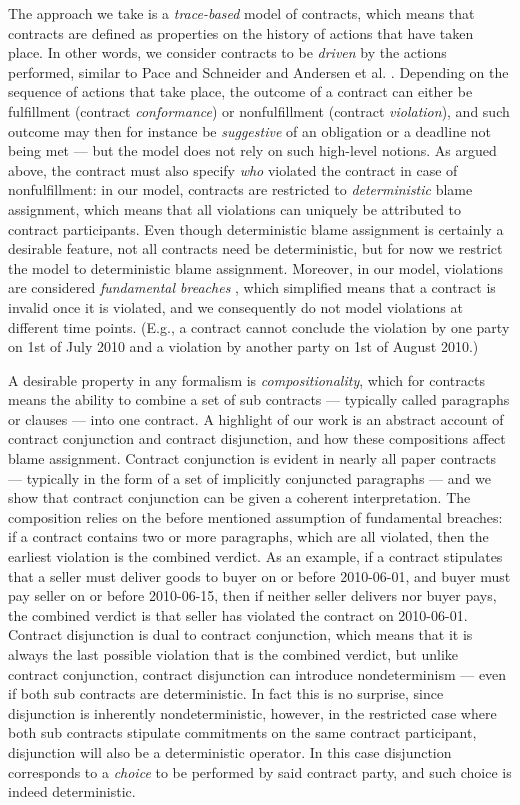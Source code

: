 \documentclass[orivec,final]{llncs-href}
\begin{document}
The approach we take is a \emph{trace-based} model of contracts, which
means that contracts are defined as properties on the history of
actions that have taken place. In other words, we consider contracts 
to be \emph{driven} by the actions performed, similar to Pace and
Schneider \cite{pace09challenges} and Andersen et
al. \cite{andersen06contracts}. Depending on the sequence of actions
that take place, the outcome of a contract can either be fulfillment
(contract \emph{conformance}) or nonfulfillment (contract
\emph{violation}), and such outcome may then for instance be
\emph{suggestive} of an obligation or a deadline not being met --- but the model
does not rely on such high-level notions. As argued above, the
contract must also specify \emph{who} violated the contract in case of
nonfulfillment: in our model, contracts are restricted to
\emph{deterministic} blame assignment, which means that all violations
can uniquely be attributed to contract participants. Even though
deterministic blame assignment is certainly a desirable feature, not
all contracts need be deterministic, but for now we restrict the model
to deterministic blame assignment.
Moreover, in our model, violations are considered 
\emph{fundamental breaches} \cite{wikipedia10fundamentalbreach}, which 
simplified means that a contract is invalid once it is violated, and
we consequently do not model violations at different time
points. (E.g., a contract cannot conclude the violation by one party on
1st of July 2010 and a violation by another party on 1st of August
2010.)

A desirable property in any formalism is \emph{compositionality},
which for contracts means the ability to combine a set of sub
contracts --- typically called paragraphs or clauses --- into one
contract. A highlight of our work is an abstract account of contract
conjunction and contract disjunction, and how these compositions
affect blame assignment. Contract conjunction is evident in nearly all
paper contracts --- typically in the form of a set of implicitly
conjuncted paragraphs --- and we show that contract conjunction can be
given a coherent interpretation. The composition relies on the before
mentioned assumption of fundamental breaches: if a contract contains
two or more paragraphs, which are all violated, then the earliest
violation is the combined verdict. As an example, if a contract
stipulates that a seller must deliver goods to buyer on or before
2010-06-01, and buyer must pay seller on or before 2010-06-15, then if
neither seller delivers nor buyer pays, the combined verdict is that seller has
violated the contract on 2010-06-01.
 Contract disjunction is dual to contract conjunction, which 
means that it is always the last possible violation that is the
combined verdict, but unlike contract conjunction, contract
disjunction can introduce nondeterminism --- even if both sub
contracts are deterministic. In fact this is no surprise, since
disjunction is inherently nondeterministic, however, in the restricted
case where both sub contracts stipulate commitments on the same
contract participant, disjunction will also be a deterministic
operator. In this case disjunction corresponds to a \emph{choice} to
be performed by said contract party, and such choice is indeed
deterministic.
\end{document}
